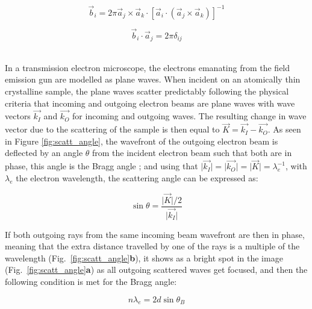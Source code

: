 \begin{minipage}{0.5\textwidth}
    \begin{equation}
        \vec{b}_i = 2 \pi \vec{a}_j \times \vec{a}_k \cdot \left[ \vec{a}_i \cdot ( \vec{a}_j \times \vec{a}_k ) \right]^{-1} 
        \label{eq:lattice_ortho_norm}
    \end{equation}
\end{minipage}%
\begin{minipage}{0.5\textwidth}
    \begin{equation}
        \vec{b}_i \cdot \vec{a}_j = 2\pi \delta_{ij}
        \label{eq:lattice_vec_prop}
    \end{equation}
\end{minipage}\\

In a transmission electron microscope, the electrons emanating from the field emission gun are modelled as plane waves. When incident on an atomically thin crystalline sample, the plane waves scatter predictably following the physical criteria that incoming and outgoing electron beams are plane waves with wave vectors $\vec{k_I}$ and $\vec{k_O}$ for incoming and outgoing waves. The resulting change in wave vector due to the scattering of the sample is then equal to $\vec{K} = \vec{k_I}-\vec{k_O}$. As seen in Figure \ref{fig:scatt_angle}, the wavefront of the outgoing electron beam is deflected by an angle $\theta$ from the incident electron beam such that both are in phase, this angle is the Bragg angle \cite{Williams2009-ww}; and using that $\vert \vec{k_I} \vert = \vert \vec{k_O} \vert = \vert \vec{K} \vert =\lambda_e^{-1}$, with $\lambda_e$ the electron wavelength, the scattering angle can be expressed as:

\begin{equation}
    \sin{\theta}=\frac{\vert \vec{K}\vert / 2}{\vert \vec{k_I}\vert}
    \label{eq:bragg_angle}
\end{equation}

If both outgoing rays from the same incoming beam wavefront are then in phase, meaning that the extra distance travelled by one of the rays is a multiple of the wavelength (Fig.~\ref{fig:scatt_angle}\textbf{b}), it shows as a bright spot in the image (Fig.~\ref{fig:scatt_angle}\textbf{a}) as all outgoing scattered waves get focused, and then the following condition is met for the Bragg angle:

\begin{equation}
    n \lambda_e = 2 d \sin{\theta_B}
    \label{eq:bragg_angle_ser}
\end{equation}

